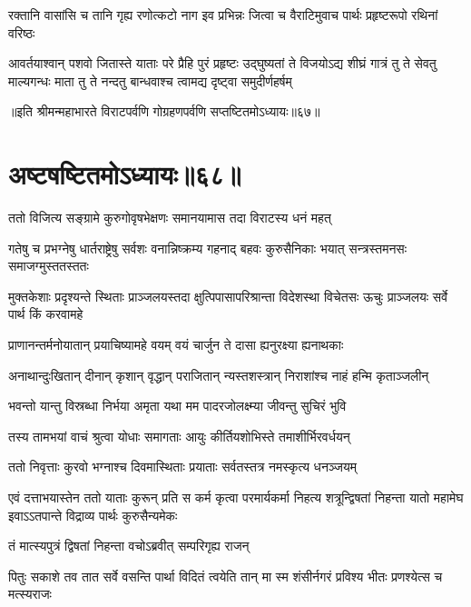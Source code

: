 \fourlineindentedshloka
{रक्तानि वासांसि च तानि गृह्य}
{रणोत्कटो नाग इव प्रभिन्नः}
{जित्वा च वैराटिमुवाच पार्थः}
{प्रहृष्टरूपो रथिनां वरिष्ठः}


\sixlineindentedshloka
{आवर्तयाश्वान् पशवो जितास्ते}
{याताः परे प्रैहि पुरं प्रहृष्टः}
{उद्‌घुष्यतां ते विजयोऽद्य शीघ्रं}
{गात्रं तु ते सेवतु माल्यगन्धः}
{माता तु ते नन्दतु बान्धवाश्च}
{त्वामद्य दृष्ट्वा समुदीर्णहर्षम्}

॥इति श्रीमन्महाभारते विराटपर्वणि गोग्रहणपर्वणि सप्तष्टितमोऽध्यायः॥६७॥

\chapter{अष्टषष्टितमोऽध्यायः॥६८॥}

\twolineshloka
{ततो विजित्य सङ्ग्रामे कुरुगोवृषभेक्षणः}
{समानयामास तदा विराटस्य धनं महत्}


\threelineshloka
{गतेषु च प्रभग्नेषु धार्तराष्ट्रेषु सर्वशः}
{वनान्निष्क्रम्य गहनाद् बहवः कुरुसैनिकाः}
{भयात् सन्त्रस्तमनसः समाजग्मुस्ततस्ततः}


\threelineshloka
{मुक्तकेशाः प्रदृश्यन्ते स्थिताः प्राञ्जलयस्तदा}
{क्षुत्पिपासापरिश्रान्ता विदेशस्था विचेतसः}
{ऊचुः प्राञ्जलयः सर्वे पार्थ किं करवामहे}


\twolineshloka
{प्राणानन्तर्मनोयातान् प्रयाचिष्यामहे वयम्}
{वयं चार्जुन ते दासा ह्यनुरक्ष्या ह्यनाथकाः}




\twolineshloka
{अनाथान्दुःखितान् दीनान् कृशान् वृद्धान् पराजितान्}
{न्यस्तशस्त्रान् निराशांश्च नाहं हन्मि कृताञ्जलीन्}


\twolineshloka
{भवन्तो यान्तु विस्रब्धा निर्भया अमृता यथा}
{मम पादरजोलक्ष्म्या जीवन्तु सुचिरं भुवि}


\twolineshloka
{तस्य तामभयां वाचं श्रुत्वा योधाः समागताः}
{आयुः कीर्तियशोभिस्ते तमाशीर्भिरवर्धयन्}


\twolineshloka
{ततो निवृत्ताः कुरवो भग्नाश्च दिवमास्थिताः}
{प्रयाताः सर्वतस्तत्र नमस्कृत्य धनञ्जयम्}


\onelineshloka
{एवं दत्ताभयास्तेन ततो याताः कुरून् प्रति}
\fourlineindentedshloka
{स कर्म कृत्वा परमार्यकर्मा}
{निहत्य शत्रून्द्विषतां निहन्ता}
{यातो महामेघ इवाऽऽतपान्ते}
{विद्राव्य पार्थः कुरुसैन्यमेकः}


\onelineindentedshloka
{तं मात्स्यपुत्रं द्विषतां निहन्ता}
{वचोऽब्रवीत् सम्परिगृह्य राजन्}


\fourlineindentedshloka
{पितुः सकाशे तव तात सर्वे}
{वसन्ति पार्था विदितं त्वयेति}
{तान् मा स्म शंसीर्नगरं प्रविश्य}
{भीतः प्रणश्येत्स च मत्स्यराजः}


